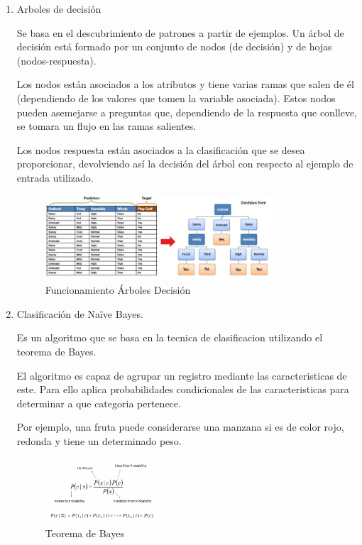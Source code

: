 \documentclass[spanish,12pt, a4paper,twoside]{paper}
\begin{document}
\begin{enumerate}
\item Arboles de decisión

Se basa en el descubrimiento de patrones a partir de ejemplos. Un árbol de decisión está formado por un conjunto de nodos (de decisión) y de hojas (nodos-respuesta).

Los nodos están asociados a los atributos y tiene varias ramas que salen de él (dependiendo de los valores que tomen la variable asociada). Estos nodos pueden asemejarse a preguntas que, dependiendo de la respuesta que conlleve, se tomara un flujo en las ramas salientes.

Los nodos respuesta están asociados a la clasificación que se desea proporcionar, devolviendo así la decisión del árbol con respecto al ejemplo de entrada utilizado.

\begin{figure}[htb]
\centering
 \includegraphics[width=0.8\textwidth]{recursos/arbol_decision_img1}
\caption{Funcionamiento Árboles Decisión}
\label{fig:fun_arb_dec}
\end{figure}
\FloatBarrier


\item Clasificación de Naïve Bayes.

Es un algoritmo que se basa en la tecnica de clasificacion utilizando el teorema de Bayes.

El algoritmo es capaz de agrupar un registro mediante las caracteristicas de este. Para ello aplica probabilidades condicionales de las caracteristicas para determinar a que categoria pertenece. 

Por ejemplo, una fruta puede considerarse una manzana si es de color rojo, redonda y tiene un determinado peso.

\begin{figure}[htb]
\centering
 \includegraphics[width=0.4\textwidth]{recursos/BayesFormula}
\caption{Teorema de Bayes}
\label{fig:BayesFormula}
\end{figure}
\FloatBarrier


\end{enumerate}
\end{document}
